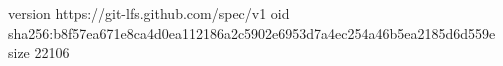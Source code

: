 version https://git-lfs.github.com/spec/v1
oid sha256:b8f57ea671e8ca4d0ea112186a2c5902e6953d7a4ec254a46b5ea2185d6d559e
size 22106
